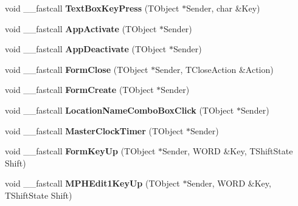 \begin{DoxyCompactItemize}
\item 
\mbox{\label{class_t_interface_ad0ce61f7a8050fb57d19ebd049fa8b49}} 
void \+\_\+\+\_\+fastcall {\bfseries Text\+Box\+Key\+Press} (T\+Object $\ast$Sender, char \&Key)
\item 
\mbox{\label{class_t_interface_af99ae89b6c7a2d37bf49cf0b5fcc3f1f}} 
void \+\_\+\+\_\+fastcall {\bfseries App\+Activate} (T\+Object $\ast$Sender)
\item 
\mbox{\label{class_t_interface_a75f68c918750c0e007ea7a85d718e2ab}} 
void \+\_\+\+\_\+fastcall {\bfseries App\+Deactivate} (T\+Object $\ast$Sender)
\item 
\mbox{\label{class_t_interface_ad1418f26381a91c4333c3947585ed60e}} 
void \+\_\+\+\_\+fastcall {\bfseries Form\+Close} (T\+Object $\ast$Sender, T\+Close\+Action \&Action)
\item 
\mbox{\label{class_t_interface_a9cef18571e29b70d02ba9a92a830b3b8}} 
void \+\_\+\+\_\+fastcall {\bfseries Form\+Create} (T\+Object $\ast$Sender)
\item 
\mbox{\label{class_t_interface_a13fee6fa07e4a4e195e8b9c7dd303db0}} 
void \+\_\+\+\_\+fastcall {\bfseries Location\+Name\+Combo\+Box\+Click} (T\+Object $\ast$Sender)
\item 
\mbox{\label{class_t_interface_ace30a12d923fc7fb489afabb0a09aa4f}} 
void \+\_\+\+\_\+fastcall {\bfseries Master\+Clock\+Timer} (T\+Object $\ast$Sender)
\item 
\mbox{\label{class_t_interface_a84a1627edee1954b3938f45473c09bfd}} 
void \+\_\+\+\_\+fastcall {\bfseries Form\+Key\+Up} (T\+Object $\ast$Sender, W\+O\+RD \&Key, T\+Shift\+State Shift)
\item 
\mbox{\label{class_t_interface_a3b462a985384627a1ab9dd2ab620fff6}} 
void \+\_\+\+\_\+fastcall {\bfseries M\+P\+H\+Edit1\+Key\+Up} (T\+Object $\ast$Sender, W\+O\+RD \&Key, T\+Shift\+State Shift)
\item 
\mbox{\label{class_t_interface_a1d61a4cdf5ab3fefc352bad71286097d}} 

\end{DoxyCompactItemize}
